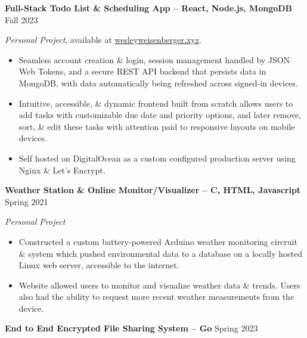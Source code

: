 \documentclass{article}
\begin{document}

\begin{adjustwidth}{1em}{1em}



    \textbf{Full-Stack Todo List \& Scheduling App -- React, Node.js, MongoDB} \hfill Fall 2023

    \textit{Personal Project}, available at \href{https://wesleyweisenberger.xyz}{wesleyweisenberger.xyz}.
    \begin{itemize}
        \item Seamless account creation \& login, session management handled by JSON Web Tokens, and a secure REST API backend that persists data in MongoDB, with data automatically being refreshed across signed-in devices.
        \item Intuitive, accessible, \& dynamic frontend built from scratch allows users to add tasks with customizable due date and priority options, and later remove, sort, \& edit these tasks with attention paid to responsive layouts on mobile devices.
        \item Self hosted on DigitalOcean as a custom configured production server using Nginx \& Let's Encrypt.
    \end{itemize}



    \vspace{1mm}



    \noindent \textbf{Weather Station \& Online Monitor/Visualizer -- C, HTML, Javascript} \hfill Spring 2021

    \textit{Personal Project}

    \begin{itemize}
        \item Constructed a custom battery-powered Arduino weather monitoring circruit \& system which pushed environmental data to a database on a locally hosted Linux web server, accessible to the internet.
        \item Website allowed users to monitor and visualize weather data \& trends. Users also had the ability to request more recent weather measurements from the device.
    \end{itemize}



    \vspace{1mm}



    \textbf{End to End Encrypted File Sharing System -- Go} \hfill Spring 2023


\end{adjustwidth}
\end{document}
